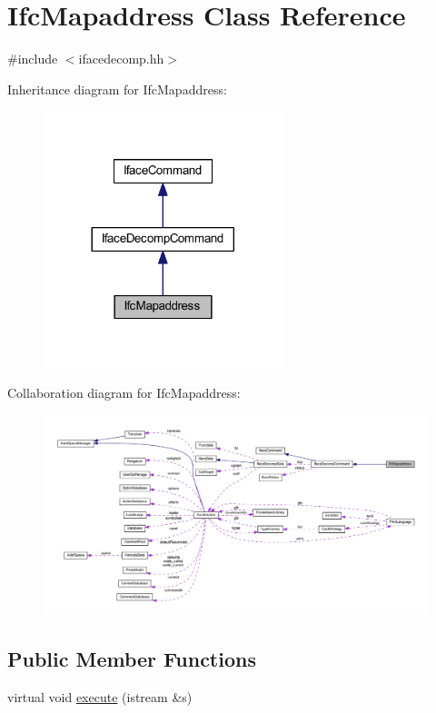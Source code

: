 \hypertarget{class_ifc_mapaddress}{}\section{Ifc\+Mapaddress Class Reference}
\label{class_ifc_mapaddress}


{\ttfamily \#include $<$ifacedecomp.\+hh$>$}



Inheritance diagram for Ifc\+Mapaddress\+:
\nopagebreak
\begin{figure}[H]
\begin{center}
\leavevmode
\includegraphics[width=197pt]{class_ifc_mapaddress__inherit__graph}
\end{center}
\end{figure}


Collaboration diagram for Ifc\+Mapaddress\+:
\nopagebreak
\begin{figure}[H]
\begin{center}
\leavevmode
\includegraphics[width=350pt]{class_ifc_mapaddress__coll__graph}
\end{center}
\end{figure}
\subsection*{Public Member Functions}
\begin{DoxyCompactItemize}
\item 
virtual void \mbox{\hyperlink{class_ifc_mapaddress_a83f33c8f34d56dfcaabe64a58f9b8236}{execute}} (istream \&s)
\end{DoxyCompactItemize}
